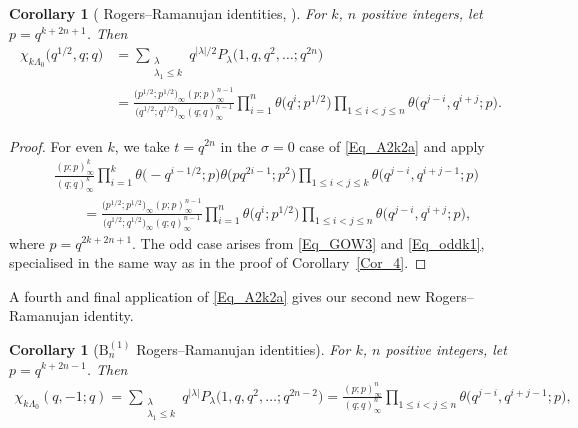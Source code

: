 \documentclass[pdftex]{sigma}
\numberwithin{equation}{section}
\newtheorem{Corollary}[Theorem]{Corollary}
\renewcommand{\leq}{\leqslant}
\newcommand{\abs}[1]{\vert#1\vert}
\newcommand{\la}{\lambda}
\newcommand{\La}{\Lambda}
\begin{document}
\begin{Corollary}[ Rogers--Ramanujan identities,
{\cite[Theorem 5.13]{RW21}}]
For $k$, $n$ positive integers, let $p=q^{k+2n+1}$.
Then
\begin{align*}
\chi_{k\La_0}\bigl(q^{1/2},q;q\bigr)&=
\sum_{\substack{\la \\[1pt] \la_1\leq k}}
q^{\abs{\la}/2} P_{\la}\bigl(1,q,q^2,\dots;q^{2n}\bigr) \\
&=\frac{\bigl(p^{1/2};p^{1/2}\bigr)_{\infty}(p;p)_{\infty}^{n-1}}
{ \bigl(q^{1/2};q^{1/2}\bigr)_{\infty}(q;q)_{\infty}^{n-1}}
\prod_{i=1}^n \theta\bigl(q^i;p^{1/2}\bigr)
\prod_{1\leq i<j\leq n} \theta\bigl(q^{j-i},q^{i+j};p\bigr).
\end{align*}
\end{Corollary}

\begin{proof}
For even $k$, we take $t=q^{2n}$ in the $\sigma=0$ case of
\eqref{Eq_A2k2a} and apply
\begin{align*}
&\frac{(p;p)_{\infty}^k}{(q;q)_{\infty}^k}
\prod_{i=1}^k \theta\bigl({-}q^{i-1/2};p\bigr)
\theta\bigl(pq^{2i-1};p^2\bigr)
\prod_{1\leq i<j\leq k} \theta\bigl(q^{j-i},q^{i+j-1};p\bigr) \\
&\qquad=\frac{\bigl(p^{1/2};p^{1/2}\bigr)_{\infty}
(p;p)_{\infty}^{n-1}}
{\bigl(q^{1/2};q^{1/2}\bigr)_{\infty}(q;q)_{\infty}^{n-1}}
\prod_{i=1}^n \theta\bigl(q^i;p^{1/2}\bigr)
\prod_{1\leq i<j\leq n} \theta\bigl(q^{j-i},q^{i+j};p\bigr),
\end{align*}
where $p=q^{2k+2n+1}$.
The odd case arises from \eqref{Eq_GOW3} and \eqref{Eq_oddk1},
specialised in the same way as in the proof of Corollary~\ref{Cor_4}.
\end{proof}

A fourth and final application of \eqref{Eq_A2k2a} gives
our second new Rogers--Ramanujan identity.

\begin{Corollary}[$\mathrm{B}_n^{(1)}$ Rogers--Ramanujan identities]
\label{Cor_7}
For $k$, $n$ positive integers, let $p=q^{k+2n-1}$.
Then
\begin{gather}\label{Eq_Bn1}
\chi_{k\La_0}(q,-1;q)=
\sum_{\substack{\la \\[1pt] \la_1\leq k}}
q^{\abs{\la}} P_{\la}\bigl(1,q,q^2,\dots;q^{2n-2}\bigr)
=\frac{(p;p)_{\infty}^n}{(q;q)_{\infty}^n}
\prod_{1\leq i<j\leq n} \theta\bigl(q^{j-i},q^{i+j-1};p\bigr),
\end{gather}
\end{Corollary}
\end{document}
